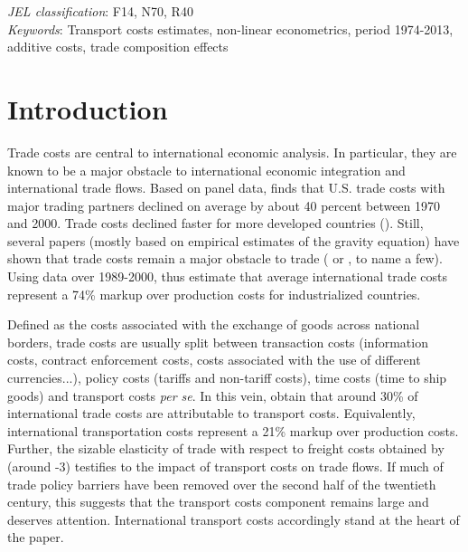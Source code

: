 \documentclass[a4paper,11pt]{article}
\begin{document}
\thispagestyle{empty} \pagestyle{plain} \setcounter{page}{1}

\bigskip


\noindent \emph{JEL classification}: F14, N70, R40 \\
\noindent \emph{Keywords}: Transport costs estimates, non-linear econometrics, period 1974-2013, additive costs, trade composition effects

{\normalsize \vspace{0cm} }

{\normalsize \titlepage }

{\normalsize \newpage }


\section{Introduction \label{sec:Intro}}

Trade costs are central to international economic analysis.
In particular, they are known to be a major obstacle to international economic integration and international trade flows.
Based on panel data, \citet{novy13} finds  that U.S.
trade costs with major trading partners declined on average by about 40 percent between 1970 and 2000.
Trade costs declined faster for more developed countries (\citealp{arvis2016trade}).
Still, several papers (mostly based on empirical estimates of the gravity equation) have shown that trade costs remain a major obstacle to trade (\citealp{Head_Mayer04} or \citealp{Disdier_Head08}, to name a few).
Using data over 1989-2000, \citet{anderson_wincoop_jel} thus estimate that average international trade costs represent a 74\% markup over production costs for industrialized countries.


Defined as the costs associated with the exchange of goods across national borders, trade costs are usually split between transaction costs (information costs, contract enforcement costs, costs associated with the use of different currencies...), policy costs (tariffs  and non-tariff costs), time costs (time to ship goods) and transport costs \emph{per se}.
In this vein, \citet{anderson_wincoop_jel} obtain that around 30\% of international trade costs are attributable to transport costs.
Equivalently, international transportation costs represent a 21\% markup over production costs.
Further, the sizable elasticity of trade with respect to freight costs obtained by \cite{Behar_Venables} (around -3) testifies to the impact of transport costs on trade flows.
If much of trade policy barriers have been removed over the second half of the twentieth century, this suggests that the transport costs component remains large and deserves attention.
International transport costs accordingly stand at the heart of the paper.\smallskip
\end{document}
